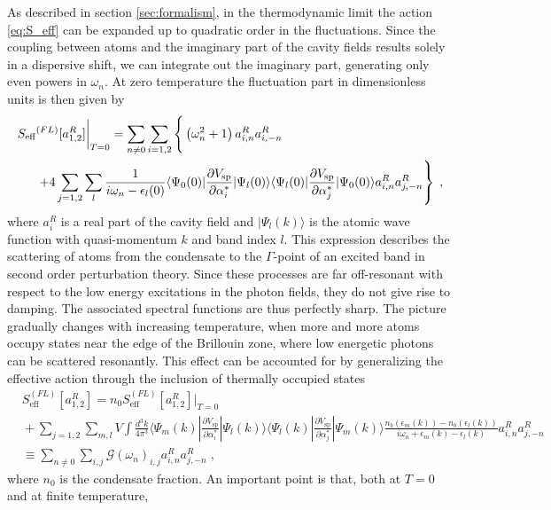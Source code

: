 \documentclass[12pt]{iopart}
\begin{document}
As described in section \ref{sec:formalism}, in the thermodynamic
limit the action \eqref{eq:S_eff} can be expanded up to quadratic order in the fluctuations. Since the coupling between atoms and the imaginary part of the cavity fields results solely in a dispersive shift, we can integrate out the imaginary part, generating only even powers in $\omega_n$. At zero temperature the fluctuation part in dimensionless units is then given by
\begin{align}
\label{eq:Sfluct_T=0}
S_\text{eff}&^{(FL)}[a^R_{1,2}]\bigg|_{T=0}=\sum_{n\neq0}\sum_{i=1,2}\Bigg\{\left(\omega_n^2+1\right)a^R_{i,n}a^R_{i,-n}\notag\\
&\left.+4\sum_{j=1,2}\sum_l\frac{1}{i\omega_n-\epsilon_l(0)}\langle\Psi_0(0)|\frac{\partial
      V_\text{sp}}{\partial \alpha_i^*}|\Psi_l(0)\rangle
    \langle\Psi_l(0)|\frac{\partial V_\text{sp}}{\partial
      \alpha_{j}^*}|\Psi_0(0)\rangle a^R_{i,n}a^R_{j,-n}\right\}\;,
\end{align}
where $a_i^R$ is a real part of the cavity field and $|\Psi_l(k)\rangle$ is the atomic wave function with quasi-momentum $k$ and band index $l$. This expression describes the scattering of atoms from the condensate to the $\Gamma$-point of an excited band in second order perturbation theory. 
Since these processes are far off-resonant with
respect to the low energy excitations in the photon fields, they do not give rise to damping. The associated 
spectral functions are thus perfectly sharp. The picture gradually changes with
increasing temperature, when more and more atoms occupy states near
the edge of the Brillouin zone, where low energetic photons can be
scattered resonantly. This effect can be accounted for by generalizing the effective action through the inclusion of thermally occupied states
\begin{align}
\label{eq:Sfluct}
&S_\text{eff}^{(FL)}[a^R_{1,2}]=n_0 S_\text{eff}^{(FL)}[a^R_{1,2}]\bigg|_{T=0}\nonumber\\
&\!+\!\!\sum_{j=1,2}\sum_{m,l} \!V\!\!\int\!\frac{d^3
      k}{4\pi^3}\langle\Psi_m(k)|\frac{\partial
      V_\text{sp}}{\partial \alpha_i^*}|\Psi_l(k)\rangle
    \langle\Psi_l(k)|\frac{\partial V_\text{sp}}{\partial
      \alpha_{j}^*}|\Psi_m(k)\rangle\frac{n_b(\epsilon_m(k))\!-\!n_b(\epsilon_l(k))\!}{i\omega_n+\epsilon_m(k)-\epsilon_l(k)}a^R_{i,n}a^R_{j,-n}\nonumber\\
& \equiv\sum_{n\neq0}\sum_{i,j}\mathcal{G}(\omega_n)_{i,j}a^R_{i,n}a^R_{j,-n}\;,
\end{align}
where $n_0$ is the condensate fraction. An important point is that, both at $T=0$ and at finite temperature, 
\end{document}
